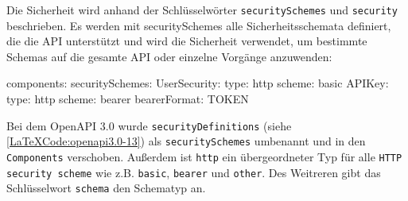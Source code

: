 Die Sicherheit wird anhand der Schlüsselwörter \texttt{securitySchemes} und \texttt{security} beschrieben. Es werden mit securitySchemes alle Sicherheitsschemata definiert, die die API unterstützt und wird die Sicherheit verwendet, um bestimmte Schemas auf die gesamte API oder einzelne Vorgänge anzuwenden\cite{openapisecurity17}: 

\begin{LaTeXCode}[caption={OpenAPI 3.0 - Security},captionpos=b, label=LaTeXCode:openapi3.0-13][numbers=none]
components:  
	securitySchemes:
		UserSecurity:
		  type: http
		  scheme: basic
		APIKey:
		  type: http
		  scheme: bearer
		  bearerFormat: TOKEN
\end{LaTeXCode}

Bei dem OpenAPI 3.0 wurde \texttt{securityDefinitions} (siehe \ref{LaTeXCode:openapi3.0-13}) als \texttt{securitySchemes} umbenannt und in den \texttt{Components} verschoben. Außerdem ist \texttt{http} ein übergeordneter Typ für alle \texttt{HTTP security scheme} wie z.B. \texttt{basic}, \texttt{bearer} und \texttt{other}. Des Weitreren gibt das Schlüsselwort \texttt{schema} den Schematyp an.
























